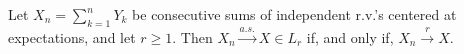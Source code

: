 Let $X_n = \sum_{k=1}^{n} Y_k$ be consecutive sums of independent r.v.'s centered at expectations, and let $r \geq 1$. Then $X_n \xrightarrow{a.s.} X \in L_r$ if, and only if, $X_n \xrightarrow{r} X$.
